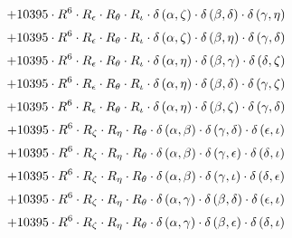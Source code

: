 \begin{subequations}
\begin{gather}
 \\[0.2em] \notag 		 + 10395 \cdot R^{6} \cdot R_{\epsilon{}} \cdot R_{\theta{}} \cdot R_{\iota{}} \cdot \delta{}\left(\alpha{}, \zeta{}\right) \cdot \delta{}\left(\beta{}, \delta{}\right) \cdot \delta{}\left(\gamma{}, \eta{}\right) 
 \\[0.2em] \notag 		 + 10395 \cdot R^{6} \cdot R_{\epsilon{}} \cdot R_{\theta{}} \cdot R_{\iota{}} \cdot \delta{}\left(\alpha{}, \zeta{}\right) \cdot \delta{}\left(\beta{}, \eta{}\right) \cdot \delta{}\left(\gamma{}, \delta{}\right) 
 \\[0.2em] \notag 		 + 10395 \cdot R^{6} \cdot R_{\epsilon{}} \cdot R_{\theta{}} \cdot R_{\iota{}} \cdot \delta{}\left(\alpha{}, \eta{}\right) \cdot \delta{}\left(\beta{}, \gamma{}\right) \cdot \delta{}\left(\delta{}, \zeta{}\right) 
 \\[0.2em] \notag 		 + 10395 \cdot R^{6} \cdot R_{\epsilon{}} \cdot R_{\theta{}} \cdot R_{\iota{}} \cdot \delta{}\left(\alpha{}, \eta{}\right) \cdot \delta{}\left(\beta{}, \delta{}\right) \cdot \delta{}\left(\gamma{}, \zeta{}\right) 
 \\[0.2em] \notag 		 + 10395 \cdot R^{6} \cdot R_{\epsilon{}} \cdot R_{\theta{}} \cdot R_{\iota{}} \cdot \delta{}\left(\alpha{}, \eta{}\right) \cdot \delta{}\left(\beta{}, \zeta{}\right) \cdot \delta{}\left(\gamma{}, \delta{}\right) 
 \\[0.2em] \notag 		 + 10395 \cdot R^{6} \cdot R_{\zeta{}} \cdot R_{\eta{}} \cdot R_{\theta{}} \cdot \delta{}\left(\alpha{}, \beta{}\right) \cdot \delta{}\left(\gamma{}, \delta{}\right) \cdot \delta{}\left(\epsilon{}, \iota{}\right) 
 \\[0.2em] \notag 		 + 10395 \cdot R^{6} \cdot R_{\zeta{}} \cdot R_{\eta{}} \cdot R_{\theta{}} \cdot \delta{}\left(\alpha{}, \beta{}\right) \cdot \delta{}\left(\gamma{}, \epsilon{}\right) \cdot \delta{}\left(\delta{}, \iota{}\right) 
 \\[0.2em] \notag 		 + 10395 \cdot R^{6} \cdot R_{\zeta{}} \cdot R_{\eta{}} \cdot R_{\theta{}} \cdot \delta{}\left(\alpha{}, \beta{}\right) \cdot \delta{}\left(\gamma{}, \iota{}\right) \cdot \delta{}\left(\delta{}, \epsilon{}\right) 
 \\[0.2em] \notag 		 + 10395 \cdot R^{6} \cdot R_{\zeta{}} \cdot R_{\eta{}} \cdot R_{\theta{}} \cdot \delta{}\left(\alpha{}, \gamma{}\right) \cdot \delta{}\left(\beta{}, \delta{}\right) \cdot \delta{}\left(\epsilon{}, \iota{}\right) 
 \\[0.2em] \notag 		 + 10395 \cdot R^{6} \cdot R_{\zeta{}} \cdot R_{\eta{}} \cdot R_{\theta{}} \cdot \delta{}\left(\alpha{}, \gamma{}\right) \cdot \delta{}\left(\beta{}, \epsilon{}\right) \cdot \delta{}\left(\delta{}, \iota{}\right) 

\end{gather}
\end{subequations}
